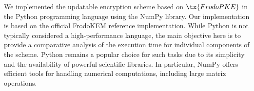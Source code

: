 \documentclass{fundam}
\begin{document}
\begin{table}[ht]
\end{table}

We implemented the updatable encryption scheme based on $\tx{FrodoPKE}$ in the Python programming language using the NumPy library. Our implementation is based on the official FrodoKEM reference implementation. While Python is not typically considered a high-performance language, the main objective here is to provide a comparative analysis of the execution time for individual components of the scheme. Python remains a popular choice for such tasks due to its simplicity and the availability of powerful scientific libraries. In particular, NumPy offers efficient tools for handling numerical computations, including large matrix operations.
\end{document}
